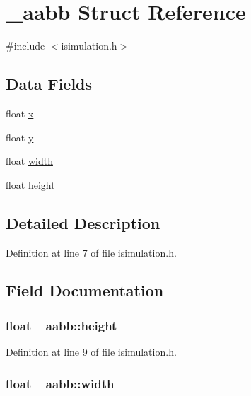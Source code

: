 \hypertarget{struct__aabb}{\section{\-\_\-aabb Struct Reference}
\label{struct__aabb}
}


{\ttfamily \#include $<$isimulation.\-h$>$}

\subsection*{Data Fields}
\begin{DoxyCompactItemize}
\item 
float \hyperlink{struct__aabb_a14157451738716a8fb2d71664a01e210}{x}
\item 
float \hyperlink{struct__aabb_a65b0be633481856576e82098405fc9ac}{y}
\item 
float \hyperlink{struct__aabb_af9871006b65a3a58bd13a40e589e25b1}{width}
\item 
float \hyperlink{struct__aabb_a212344ad875dfafbed336f052f2817da}{height}
\end{DoxyCompactItemize}


\subsection{Detailed Description}


Definition at line 7 of file isimulation.\-h.



\subsection{Field Documentation}
\hypertarget{struct__aabb_a212344ad875dfafbed336f052f2817da}{
\subsubsection[{height}]{\setlength{\rightskip}{0pt plus 5cm}float \-\_\-aabb\-::height}}\label{struct__aabb_a212344ad875dfafbed336f052f2817da}


Definition at line 9 of file isimulation.\-h.

\hypertarget{struct__aabb_af9871006b65a3a58bd13a40e589e25b1}{
\subsubsection[{width}]{\setlength{\rightskip}{0pt plus 5cm}float \-\_\-aabb\-::width}}\label{struct__aabb_af9871006b65a3a58bd13a40e589e25b1}



